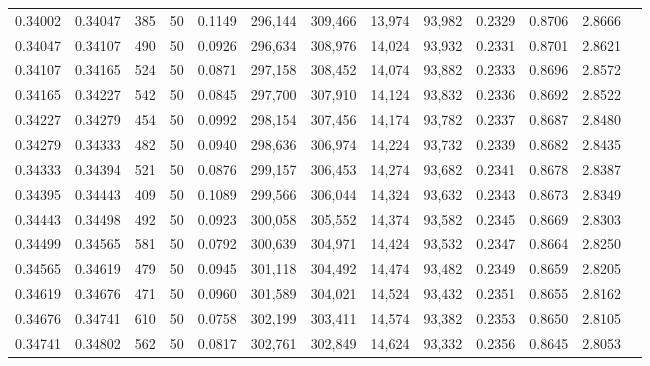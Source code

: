 \begin{tabular}{rrrrrrrrrrrrr}
0.34002 & 0.34047 &   385 &  50 &                                     0.1149 & 296,144 & 309,466 &  13,974 &  93,982 & 0.2329 & 0.8706 & 2.8666 \\
0.34047 & 0.34107 &   490 &  50 &                                     0.0926 & 296,634 & 308,976 &  14,024 &  93,932 & 0.2331 & 0.8701 & 2.8621 \\
0.34107 & 0.34165 &   524 &  50 &                                     0.0871 & 297,158 & 308,452 &  14,074 &  93,882 & 0.2333 & 0.8696 & 2.8572 \\
0.34165 & 0.34227 &   542 &  50 &                                     0.0845 & 297,700 & 307,910 &  14,124 &  93,832 & 0.2336 & 0.8692 & 2.8522 \\
0.34227 & 0.34279 &   454 &  50 &                                     0.0992 & 298,154 & 307,456 &  14,174 &  93,782 & 0.2337 & 0.8687 & 2.8480 \\
0.34279 & 0.34333 &   482 &  50 &                                     0.0940 & 298,636 & 306,974 &  14,224 &  93,732 & 0.2339 & 0.8682 & 2.8435 \\
0.34333 & 0.34394 &   521 &  50 &                                     0.0876 & 299,157 & 306,453 &  14,274 &  93,682 & 0.2341 & 0.8678 & 2.8387 \\
0.34395 & 0.34443 &   409 &  50 &                                     0.1089 & 299,566 & 306,044 &  14,324 &  93,632 & 0.2343 & 0.8673 & 2.8349 \\
0.34443 & 0.34498 &   492 &  50 &                                     0.0923 & 300,058 & 305,552 &  14,374 &  93,582 & 0.2345 & 0.8669 & 2.8303 \\
0.34499 & 0.34565 &   581 &  50 &                                     0.0792 & 300,639 & 304,971 &  14,424 &  93,532 & 0.2347 & 0.8664 & 2.8250 \\
0.34565 & 0.34619 &   479 &  50 &                                     0.0945 & 301,118 & 304,492 &  14,474 &  93,482 & 0.2349 & 0.8659 & 2.8205 \\
0.34619 & 0.34676 &   471 &  50 &                                     0.0960 & 301,589 & 304,021 &  14,524 &  93,432 & 0.2351 & 0.8655 & 2.8162 \\
0.34676 & 0.34741 &   610 &  50 &                                     0.0758 & 302,199 & 303,411 &  14,574 &  93,382 & 0.2353 & 0.8650 & 2.8105 \\
0.34741 & 0.34802 &   562 &  50 &                                     0.0817 & 302,761 & 302,849 &  14,624 &  93,332 & 0.2356 & 0.8645 & 2.8053 \\

\end{tabular}
